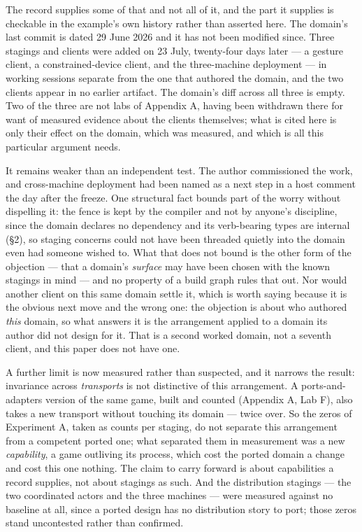 \documentclass[
]{article}
\begin{document}
The record supplies some of that and not all of it, and the part it
supplies is checkable in the example's own history rather than asserted
here. The domain's last commit is dated 29 June 2026 and it has not been
modified since. Three stagings and clients were added on 23 July,
twenty-four days later --- a gesture client, a constrained-device
client, and the three-machine deployment --- in working sessions
separate from the one that authored the domain, and the two clients
appear in no earlier artifact. The domain's diff across all three is
empty. Two of the three are not labs of Appendix A, having been
withdrawn there for want of measured evidence about the clients
themselves; what is cited here is only their effect on the domain, which
was measured, and which is all this particular argument needs.

It remains weaker than an independent test. The author commissioned the
work, and cross-machine deployment had been named as a next step in a
host comment the day after the freeze. One structural fact bounds part
of the worry without dispelling it: the fence is kept by the compiler
and not by anyone's discipline, since the domain declares no dependency
and its verb-bearing types are internal (§2), so staging concerns could
not have been threaded quietly into the domain even had someone wished
to. What that does not bound is the other form of the objection --- that
a domain's \emph{surface} may have been chosen with the known stagings
in mind --- and no property of a build graph rules that out. Nor would
another client on this same domain settle it, which is worth saying
because it is the obvious next move and the wrong one: the objection is
about who authored \emph{this} domain, so what answers it is the
arrangement applied to a domain its author did not design for it. That
is a second worked domain, not a seventh client, and this paper does not
have one.

A further limit is now measured rather than suspected, and it narrows
the result: invariance across \emph{transports} is not distinctive of
this arrangement. A ports-and-adapters version of the same game, built
and counted (Appendix A, Lab F), also takes a new transport without
touching its domain --- twice over. So the zeros of Experiment A, taken
as counts per staging, do not separate this arrangement from a competent
ported one; what separated them in measurement was a new
\emph{capability}, a game outliving its process, which cost the ported
domain a change and cost this one nothing. The claim to carry forward is
about capabilities a record supplies, not about stagings as such. And
the distribution stagings --- the two coordinated actors and the three
machines --- were measured against no baseline at all, since a ported
design has no distribution story to port; those zeros stand uncontested
rather than confirmed.
\end{document}

